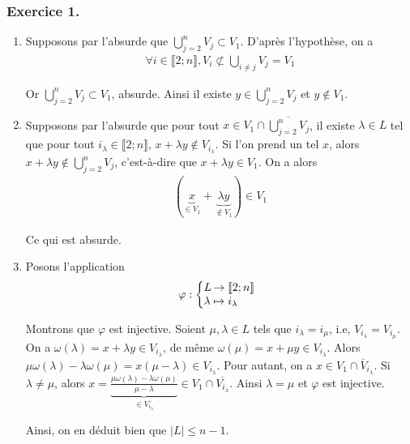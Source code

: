 \documentclass{article}
\begin{document}
\subsubsection*{Exercice 1.}
\begin{enumerate}
\item Supposons par l'absurde que $\bigcup_{j=2}^{n} V_j \subset V_1$. D'après l'hypothèse, on a 
\begin{align*}
\forall i\in\llbracket 2;n\rrbracket, V_i\not\subset \bigcup_{i\neq j}V_j=V_1
\end{align*}

Or $\bigcup_{j=2}^n V_j \subset V_1$, absurde. Ainsi il existe $y\in\bigcup_{j=2}^n V_j$ et $y\notin V_1$.

\item Supposons par l'absurde que pour tout $x\in V_1 \cap \overline{\bigcup_{j=2}^n V_j}$, il existe $\lambda \in L$ tel que pour tout $i_{\lambda}\in \llbracket 2;n\rrbracket$, $x+\lambda y \notin V_{i_{\lambda}}$. Si l'on prend un tel $x$, alors $x+\lambda y \notin \bigcup_{j=2}^n V_j$, c'est-à-dire que $x+\lambda y \in V_1$. On a alors
\begin{align*}
(\underbrace{x}_{\in V_1}+\underbrace{\lambda y}_{\notin V_1})\in V_1
\end{align*}

Ce qui est absurde.

\item Posons l'application
\begin{align*}
  \varphi : \left\{
     \begin{array}{@{}l@{\thinspace}l}
      L&\to \llbracket 2;n\rrbracket \\
      \lambda &\mapsto i_{\lambda}
     \end{array}
   \right.   
\end{align*}

Montrons que $\varphi$ est injective. Soient $\mu, \lambda \in L$ tels que $i_{\lambda}=i_{\mu}$, i.e, $V_{i_{\lambda}}=V_{i_{\mu}}$. On a $\omega(\lambda) = x+\lambda y \in V_{i_\lambda}$, de même $\omega(\mu) = x+\mu y \in V_{i_{\lambda}}$. Alors $\mu\omega(\lambda)-\lambda\omega(\mu) = x(\mu-\lambda)\in V_{i_{\lambda}}$. Pour autant, on a $x\in V_1\cap \overline V_{i_{\lambda}}$. Si $\lambda \neq \mu$, alors $x = \underbrace{\frac{\mu\omega(\lambda)-\lambda\omega(\mu)}{\mu-\lambda}}_{\in V_{i_{\lambda}}}\in V_1\cap \overline{V_{i_{\lambda}}}$. Ainsi $\lambda = \mu$ et $\varphi$ est injective.

Ainsi, on en déduit bien que $|L|\leq n-1$.
\end{enumerate}
\end{document}

